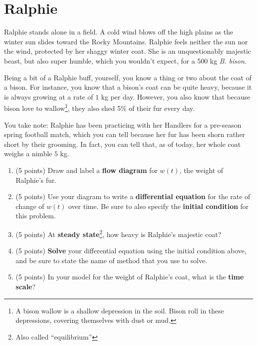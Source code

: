 \documentclass[11pt,onecolumn,superscriptaddress,notitlepage]{article}
\begin{document}
\clearpage

\section{Ralphie}

Ralphie stands alone in a field. A cold wind blows off the high plains as the winter sun slides toward the Rocky Mountains. Ralphie feels neither the sun nor the wind, protected by her shaggy winter coat. She is an unquestionably majestic beast, but also super humble, which you wouldn't expect, for a 500 kg {\it B. bison.}

Being a bit of a Ralphie buff, yourself, you know a thing or two about the coat of a bison. For instance, you know that a bison's coat can be quite heavy, because it is always growing at a rate of $1$ kg per day. However, you also know that because bison love to wallow\footnote{
A bison wallow is a shallow depression in the soil. Bison roll in these depressions, covering themselves with dust or mud.}, they also shed 5\% of their fur every day. 

You take note: Ralphie has been practicing with her Handlers for a pre-season spring football match, which you can tell because her fur has been shorn rather short by their grooming. In fact, you can tell that, as of today, her whole coat weighs a nimble $5$ kg. 

\begin{enumerate}
	
	\item (5 points) Draw and label a {\bf flow diagram} for $w(t)$, the weight of Ralphie's fur.
	
	\item (5 points) Use your diagram to write a {\bf differential equation} for the rate of change of $w(t)$ over time. Be sure to also specify the {\bf initial condition} for this problem. 
	
	\item (5 points) At {\bf steady state}\footnote{Also called ``equilibrium''}, how heavy is Ralphie's majestic coat?
	
	\item (5 points) {\bf Solve} your differential equation using the initial condition above, and be sure to state the name of method that you use to solve.
	
	\item (5 points) In your model for the weight of Ralphie's coat, what is the {\bf time scale}?

\end{enumerate}\vspace{0.1in}
\end{document}
